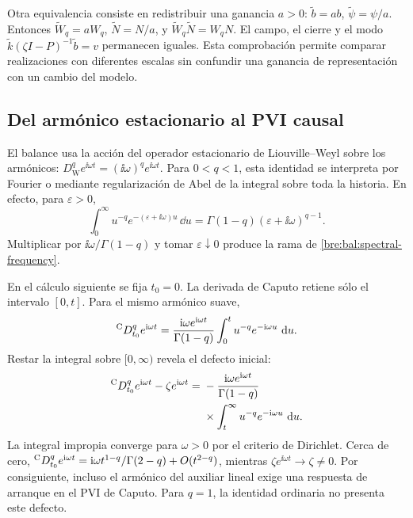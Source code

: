 Otra equivalencia consiste en redistribuir una ganancia \(a>0\):
\(\widetilde b=ab\), \(\widetilde\psi=\psi/a\).
Entonces \(\widetilde W_q=aW_q\),
\(\widetilde N=N/a\), y
\(\widetilde W_q\widetilde N=W_qN\). El campo, el cierre y el modo
\(\widetilde k(\zeta I-P)^{-1}\widetilde b=v\) permanecen iguales.
Esta comprobación permite comparar realizaciones con diferentes escalas
sin confundir una ganancia de representación con un cambio del modelo.

\subsection{Del armónico estacionario al PVI causal}
\label{bre:bal:weyl-caputo}

El balance usa la acción del operador estacionario de Liouville--Weyl
sobre los armónicos:
\(D_{\mathrm W}^{q}e^{\ii\omega t}=(\ii\omega)^qe^{\ii\omega t}\).
Para \(0<q<1\), esta identidad se interpreta por Fourier o mediante
regularización de Abel de la integral sobre toda la historia. En efecto,
para \(\varepsilon>0\),
\begin{equation}
 \int_0^\infty u^{-q}e^{-(\varepsilon+\ii\omega)u}\,\dd u
 =\Gamma(1-q)(\varepsilon+\ii\omega)^{q-1}.
 \label{bre:bal:abel}
\end{equation}
Multiplicar por \(\ii\omega/\Gamma(1-q)\) y tomar
\(\varepsilon\downarrow0\) produce la rama de
\eqref{bre:bal:spectral-frequency}.

En el cálculo siguiente se fija \(t_0=0\). La derivada de Caputo
retiene sólo el intervalo \([0,t]\).
Para el mismo armónico suave,
\begin{equation}
 {}^{\mathrm C}D_{t_0}^{q}e^{\mathrm i\omega t}
 =\frac{\mathrm i\omega e^{\mathrm i\omega t}}{\Gamma(1-q)}
   \int_0^t u^{-q}e^{-\mathrm i\omega u}\,\,\mathrm d u.
 \label{bre:bal:caputo-harmonic}
\end{equation}
Restar la integral sobre \([0,\infty)\) revela el defecto inicial:
\begin{equation}
 \begin{aligned}
 {}^{\mathrm C}D_{t_0}^{q}e^{\mathrm i\omega t}-\zeta e^{\mathrm i\omega t}
 ={}&-\frac{\mathrm i\omega e^{\mathrm i\omega t}}{\Gamma(1-q)}\\
 &\times\int_t^\infty u^{-q}e^{-\mathrm i\omega u}\,\,\mathrm d u.
 \end{aligned}
 \label{bre:bal:initial-defect}
\end{equation}
La integral impropia converge para \(\omega>0\) por el criterio de
Dirichlet. Cerca de cero,
\({}^{\mathrm C}D_{t_0}^{q}e^{\mathrm i\omega t}
=\mathrm i\omega t^{1-q}/\Gamma(2-q)+O(t^{2-q})\), mientras
\(\zeta e^{\ii\omega t}\to\zeta\ne0\).
Por consiguiente, incluso el armónico del auxiliar lineal exige una
respuesta de arranque en el PVI de Caputo. Para \(q=1\), la identidad
ordinaria no presenta este defecto.

